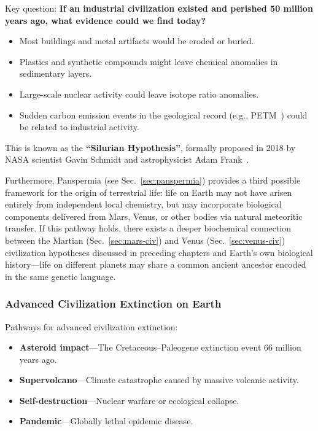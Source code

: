 \documentclass[aps,prd,twocolumn,superscriptaddress,nofootinbib]{revtex4-2}
\begin{document}
Key question: \textbf{If an industrial civilization existed and perished 50 million years ago, what evidence could we find today?}

\begin{itemize}
  \item Most buildings and metal artifacts would be eroded or buried.
  \item Plastics and synthetic compounds might leave chemical anomalies in sedimentary layers.
  \item Large-scale nuclear activity could leave isotope ratio anomalies.
  \item Sudden carbon emission events in the geological record (e.g., PETM~\cite{Kennett1991}) could be related to industrial activity.
\end{itemize}

This is known as the \textbf{``Silurian Hypothesis''}, formally proposed in 2018 by NASA scientist Gavin Schmidt and astrophysicist Adam Frank~\cite{Schmidt2019}.

Furthermore, Panspermia (see Sec.~\ref{sec:panspermia}) provides a third possible framework for the origin of terrestrial life: life on Earth may not have arisen entirely from independent local chemistry, but may incorporate biological components delivered from Mars, Venus, or other bodies via natural meteoritic transfer. If this pathway holds, there exists a deeper biochemical connection between the Martian (Sec.~\ref{sec:mars-civ}) and Venus (Sec.~\ref{sec:venus-civ}) civilization hypotheses discussed in preceding chapters and Earth's own biological history---life on different planets may share a common ancient ancestor encoded in the same genetic language.

\subsubsection{Advanced Civilization Extinction on Earth}\label{sec:earth-extinction}

Pathways for advanced civilization extinction:

\begin{itemize}
  \item \textbf{Asteroid impact}---The Cretaceous--Paleogene extinction event 66 million years ago.
  \item \textbf{Supervolcano}---Climate catastrophe caused by massive volcanic activity.
  \item \textbf{Self-destruction}---Nuclear warfare or ecological collapse.
  \item \textbf{Pandemic}---Globally lethal epidemic disease.
\end{itemize}
\end{document}
